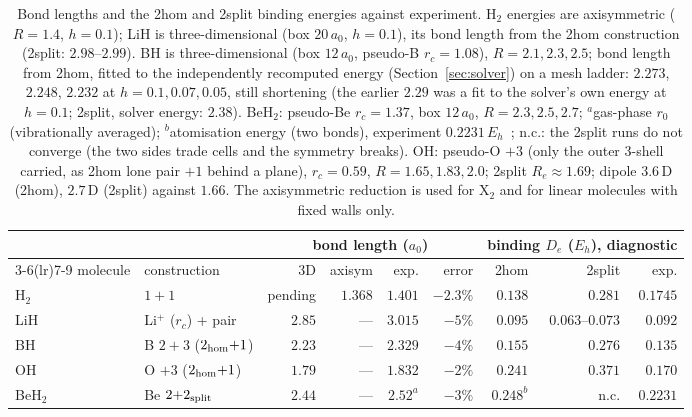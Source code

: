 \documentclass[11pt]{article}
\begin{document}
\begin{table}[H]
\centering
\small
\setlength{\tabcolsep}{3.5pt}
\begin{tabular}{llrrrrrrr}
\toprule
& & \multicolumn{4}{c}{bond length ($a_0$)} & \multicolumn{3}{c}{binding $D_e$ ($E_h$), diagnostic} \\
\cmidrule(lr){3-6}\cmidrule(lr){7-9}
molecule & construction & 3D & axisym & exp. & error & 2hom & 2split & exp. \\
\midrule
H$_2$   & $1{+}1$                       & pending & $1.368$ & $1.401$ & $-2.3\%$ & $0.138$ & $0.281$ & $0.1745$ \\
LiH     & Li$^+$ ($r_c$) + pair         & $2.85$  & ---     & $3.015$ & $-5\%$   & $0.095$ & $0.063$--$0.073$ & $0.092$ \\
BH      & B $2{+}3$ ($2_{\rm hom}{+}1$) & $2.23$  & ---     & $2.329$ & $-4\%$ & $0.155$ & $0.276$ & $0.135$ \\ %
OH      & O $+3$ ($2_{\rm hom}{+}1$)     & $1.79$  & ---     & $1.832$ & $-2\%$ & $0.241$ & $0.371$ & $0.170$ \\ %
BeH$_2$ & Be $2{+}2_{\rm split}$         & $2.44$  & ---     & $2.52^{a}$ & $-3\%$ & $0.248^{b}$ & n.c. & $0.2231$ \\ %
\bottomrule
\end{tabular}
\caption{Bond lengths and the 2hom and 2split binding energies against experiment. H$_2$ energies are
axisymmetric ($R = 1.4$, $h = 0.1$); LiH is three-dimensional (box $20\,a_0$, $h = 0.1$), its bond
length from the 2hom construction (2split: $2.98$--$2.99$). BH is three-dimensional (box
$12\,a_0$, pseudo-B $r_c = 1.08$), $R = 2.1, 2.3, 2.5$; bond length from 2hom, fitted to the independently
recomputed energy (Section~\ref{sec:solver}) on a mesh ladder: $2.273$, $2.248$, $2.232$ at $h = 0.1, 0.07, 0.05$, still
shortening (the earlier $2.29$ was a fit to the solver's own energy at $h = 0.1$; 2split, solver energy: $2.38$). BeH$_2$: pseudo-Be $r_c = 1.37$, box
$12\,a_0$, $R = 2.3, 2.5, 2.7$; $^{a}$gas-phase $r_0$ (vibrationally averaged); $^{b}$atomisation
energy (two bonds), experiment $0.2231\,E_h$~\cite{osti}; n.c.: the 2split runs do not converge (the two sides trade cells and the
symmetry breaks). OH: pseudo-O $+3$ (only the outer $3$-shell carried, as 2hom lone pair $+1$
behind a plane), $r_c = 0.59$, $R = 1.65, 1.83, 2.0$; 2split $R_e \approx 1.69$; dipole $3.6$\,D (2hom),
$2.7$\,D (2split) against $1.66$. The axisymmetric reduction is used for X$_2$ and for linear
molecules with fixed walls only.}
\label{tab:geom}
\end{table}
\end{document}
